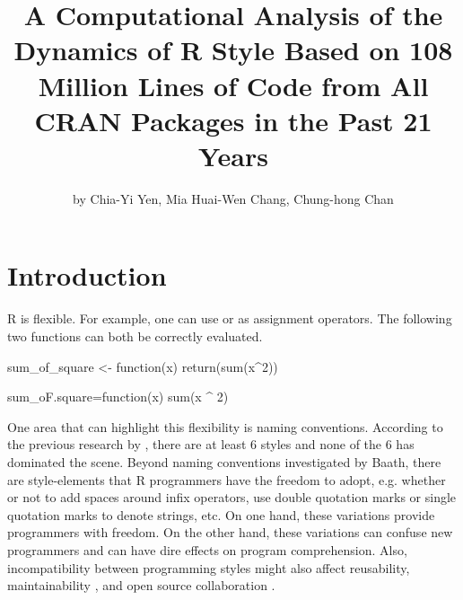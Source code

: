 \title{A Computational Analysis of the Dynamics of R Style Based on 108 Million Lines of Code from All CRAN Packages in the Past 21 Years}
\author{by Chia-Yi Yen, Mia Huai-Wen Chang, Chung-hong Chan}

\maketitle


\section{Introduction}

R is flexible. For example, one can use \code{<-} or \code{=} as assignment operators. The following two functions can both be correctly evaluated.

\begin{example}
sum_of_square <- function(x) {
    return(sum(x^2))
}
\end{example}

\begin{example}
sum_oF.square=function(x)
{
    sum(x ^ 2)}
\end{example}

One area that can highlight this flexibility is naming conventions. According to the previous research by \citet{baaaath}, there are at least 6 styles and none of the 6 has dominated the scene. Beyond naming conventions investigated by Baath, there are style-elements that R programmers have the freedom to adopt, e.g. whether or not to add spaces around infix operators, use double quotation marks or single quotation marks to denote strings, etc. On one hand, these variations provide programmers with freedom. On the other hand, these variations can confuse new programmers and can have dire effects on program comprehension. Also, incompatibility between programming styles might also affect reusability, maintainability \citep{elish}, and open source collaboration \citep{wang}. 

